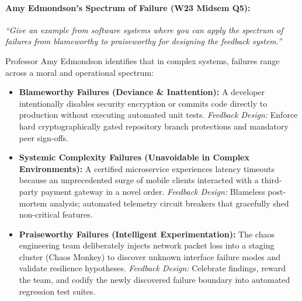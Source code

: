 \vspace{0.8em}
\paragraph{Amy Edmondson's Spectrum of Failure (W23 Midsem Q5):}
\textit{``Give an example from software systems where you can apply the spectrum of failures from blameworthy to praiseworthy for designing the feedback system.''}

\begin{tcolorbox}[colback=white,colframe=seSecondary,title={\small \textbf{Model Solution: Failure Spectrum in Site Reliability Engineering (SRE)}}]
Professor Amy Edmondson identifies that in complex systems, failures range across a moral and operational spectrum:
\begin{itemize}[leftmargin=1.5em, itemsep=1pt]
    \item \textbf{Blameworthy Failures (Deviance \& Inattention):} A developer intentionally disables security encryption or commits code directly to production without executing automated unit tests. \textit{Feedback Design:} Enforce hard cryptographically gated repository branch protections and mandatory peer sign-offs.
    \item \textbf{Systemic Complexity Failures (Unavoidable in Complex Environments):} A certified microservice experiences latency timeouts because an unprecedented surge of mobile clients interacted with a third-party payment gateway in a novel order. \textit{Feedback Design:} Blameless post-mortem analysis; automated telemetry circuit breakers that gracefully shed non-critical features.
    \item \textbf{Praiseworthy Failures (Intelligent Experimentation):} The chaos engineering team deliberately injects network packet loss into a staging cluster (Chaos Monkey) to discover unknown interface failure modes and validate resilience hypotheses. \textit{Feedback Design:} Celebrate findings, reward the team, and codify the newly discovered failure boundary into automated regression test suites.
\end{itemize}
\end{tcolorbox}

